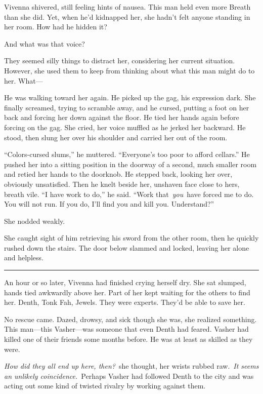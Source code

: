 Vivenna shivered, still feeling hints of nausea. This man held even more Breath than she did. Yet, when he’d kidnapped her, she hadn’t felt anyone standing in her room. How had he hidden it?

And what was that voice?

They seemed silly things to distract her, considering her current situation. However, she used them to keep from thinking about what this man might do to her. What—

He was walking toward her again. He picked up the gag, his expression dark. She finally screamed, trying to scramble away, and he cursed, putting a foot on her back and forcing her down against the floor. He tied her hands again before forcing on the gag. She cried, her voice muffled as he jerked her backward. He stood, then slung her over his shoulder and carried her out of the room.

“Colors-cursed slums,” he muttered. “Everyone’s too poor to afford cellars.” He pushed her into a sitting position in the doorway of a second, much smaller room and retied her hands to the doorknob. He stepped back, looking her over, obviously unsatisfied. Then he knelt beside her, unshaven face close to hers, breath vile. “I have work to do,” he said. “Work that~\textit{you}~have forced me to do. You will not run. If you do, I’ll find you and kill you. Understand?”

She nodded weakly.

She caught sight of him retrieving his sword from the other room, then he quickly rushed down the stairs. The door below slammed and locked, leaving her alone and helpless.

\bigskip \hrule \bigskip

An hour or so later, Vivenna had finished crying herself dry. She sat slumped, hands tied awkwardly above her. Part of her kept waiting for the others to find her. Denth, Tonk Fah, Jewels. They were experts. They’d be able to save her.

No rescue came. Dazed, drowsy, and sick though she was, she realized something. This man—this Vasher—was someone that even Denth had feared. Vasher had killed one of their friends some months before. He was at least as skilled as they were.

\textit{How did they all end up here, then?}~she thought, her wrists rubbed raw.~\textit{It seems an unlikely coincidence.}~Perhaps Vasher had followed Denth to the city and was acting out some kind of twisted rivalry by working against them.

